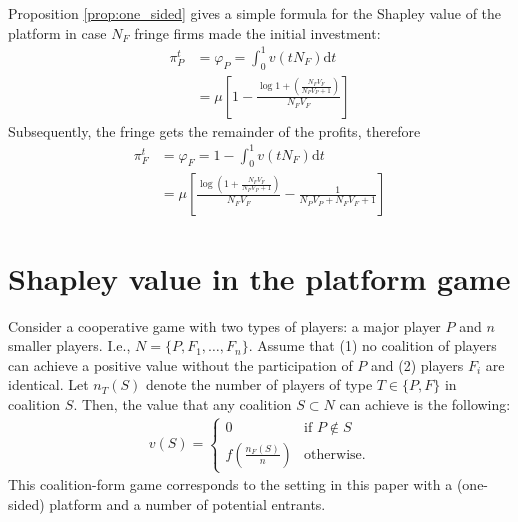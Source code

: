 \documentclass[a4paper]{article}
\newcommand{\dt}{\mathrm{d}t}
\begin{document}
Proposition \ref{prop:one_sided} gives a simple formula for the Shapley value of the platform in case $N_F$ fringe firms made the initial investment:
\begin{align*}
    \pi^t_P &= \varphi_P = \int_0^1 v(tN_F) \dt \\
            &= \mu \left[ 1 - \frac{\log 1 + \left( \frac{N_F V_F}{N_P V_P + 1} \right)}{N_F V_F} \right]
\end{align*}
Subsequently, the fringe gets the remainder of the profits, therefore
\begin{align*}
    \pi^t_F &= \varphi_F =  1 - \int_0^1 v(tN_F) \dt \\
            &= \mu \left[ \frac{\log \left( 1 + \frac{N_F V_F}{N_P V_P + 1} \right)}{N_F V_F} - \frac{1}{N_P V_P + N_F V_F + 1} \right]
\end{align*}




\appendix

\printbibliography


\section{Shapley value in the platform game}

Consider a cooperative game with two types of players: a major player $P$ and $n$ smaller players.
I.e., $N = \{P, F_1, \dots, F_n\}$.
Assume that (1) no coalition of players can achieve a positive value without the participation of $P$ and (2) players $F_i$ are identical.
Let $n_T(S)$ denote the number of players of type $T \in \{P, F\}$ in coalition $S$. Then, the value that any coalition $S \subset N$ can achieve is the following:
\begin{align*}
    v(S) = \begin{cases}
        0                              & \text{if } P \notin S \\
        f\left(\frac{n_F(S)}{n}\right) & \text{otherwise}.
    \end{cases}
\end{align*}
This coalition-form game corresponds to the setting in this paper with a (one-sided) platform and a number of potential entrants.
\end{document}
